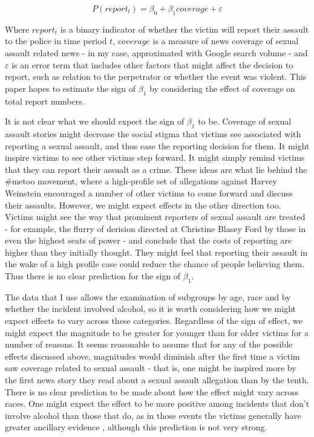 \documentclass[AER,draftmode]{AEA}
\begin{document}
$$
P(report_t) = \beta_0 + \beta_1 coverage + \varepsilon
$$

Where $report_t$ is a binary indicator of whether the victim will report their assault to the police in time period $t$, $coverage$ is a measure of news coverage of sexual assault related news - in my case, approximated with Google search volume - and $\varepsilon$ is an error term that includes other factors that might affect the decision to report, such as relation to the perpetrator or whether the event was violent. This paper hopes to estimate the sign of $\beta_1$ by considering the effect of coverage on total report numbers. 

It is not clear what we should expect the sign of $\beta_1$ to be. Coverage of sexual assault stories might decrease the social stigma that victims see associated with reporting a sexual assault, and thus ease the reporting decision for them. It might inspire victims to see other victims step forward. It might simply remind victims that they can report their assualt as a crime. These ideas are what lie behind the \#metoo movement, where a high-profile set of allegations against Harvey Weinstein encouraged a number of other victims to come forward and discuss their assaults. However, we might expect effects in the other direction too. Victims might see the way that prominent reporters of sexual assault are treated - for example, the flurry of derision directed at Christine Blasey Ford by those in even the highest seats of power - and conclude that the costs of reporting are higher than they initially thought. They might feel that reporting their assault in the wake of a high profile case could reduce the chance of people believing them. Thus there is no clear prediction for the sign of $\beta_1$.

The data that I use allows the examination of subgroups by age, race and by whether the incident involved alcohol, so it is worth considering how we might expect effects to vary across these categories. Regardless of the sign of effect, we might expect the magnitude to be greater for younger than for older victims for a number of reasons. It seems reasonable to assume that for any of the possible effects discussed above, magnitudes would diminish after the first time a victim saw coverage related to sexual assault - that is, one might be inspired more by the first news story they read about a sexual assault allegation than by the tenth. There is no clear prediction to be made about how the effect might vary across races. One might expect the effect to be more positive among incidents that don't involve alcohol than those that do, as in those events the victims generally have greater ancillary evidence \cite{allen_reporting_2007}, although this prediction is not very strong.
\end{document}
